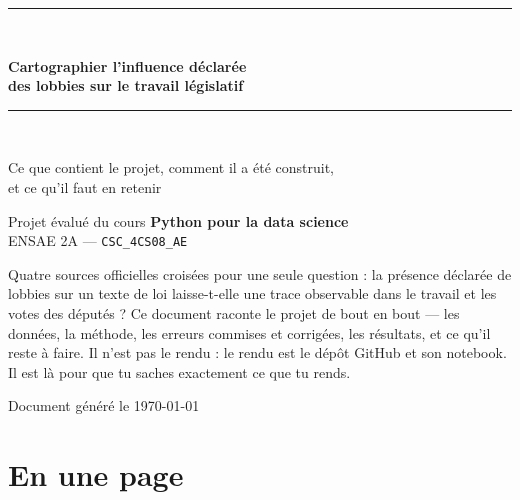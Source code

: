 \documentclass[11pt,a4paper]{article}
\begin{document}
\begin{titlepage}
\centering
\vspace*{2.2cm}
{\color{cBleu}\rule{\textwidth}{2pt}}\\[0.6em]
{\Huge\bfseries\color{cBleu} Cartographier l'influence déclarée\\[0.25em] des lobbies sur le travail législatif\par}
\vspace{0.5em}
{\color{cBleu}\rule{\textwidth}{2pt}}\\[1.6em]
{\Large Ce que contient le projet, comment il a été construit,\\[0.3em] et ce qu'il faut en retenir\par}
\vspace{2.2cm}
{\large Projet évalué du cours \textbf{Python pour la data science}\\[0.3em]
ENSAE 2A --- \texttt{CSC\_4CS08\_AE}\par}
\vspace{1.4cm}
\begin{minipage}{0.84\textwidth}
\color{cGris}\small
Quatre sources officielles croisées pour une seule question : la présence déclarée de
lobbies sur un texte de loi laisse-t-elle une trace observable dans le travail et les
votes des députés ? Ce document raconte le projet de bout en bout --- les données, la
méthode, les erreurs commises et corrigées, les résultats, et ce qu'il reste à faire.
Il n'est pas le rendu : le rendu est le dépôt GitHub et son notebook. Il est là pour
que tu saches exactement ce que tu rends.
\end{minipage}
\vfill
{\color{cGris}\small Document généré le \today\par}
\end{titlepage}

\tableofcontents
\newpage

\section{En une page}
\end{document}
